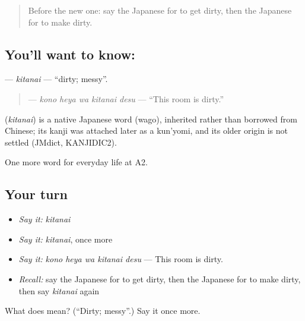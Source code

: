\label{lesson:JA-C160-kitanai}



\begin{quote}
Before the new one: say the Japanese for to get dirty, then the Japanese for to make dirty.
\end{quote}

\subsection*{You'll want to know: }
\textbf{} — \emph{kitanai} — \textquotedblleft{}dirty; messy\textquotedblright{}.

\begin{quote}
\textbf{  } — \emph{kono heya wa kitanai desu} — \textquotedblleft{}This room is dirty.\textquotedblright{}
\end{quote}

\begin{cousinweb}
\textbf{} (\emph{kitanai}) is a native Japanese word (wago), inherited rather than borrowed from Chinese; its kanji was attached later as a kun'yomi, and its older origin is not settled (JMdict, KANJIDIC2).
\end{cousinweb}

\begin{grammarlens}[title={What you've built}]
One more word for everyday life at A2.
\end{grammarlens}

\subsection*{Your turn}
\begin{itemize}
\raggedright
  \item \emph{Say it:} \emph{kitanai}
  \item \emph{Say it:} \emph{kitanai}, once more
  \item \emph{Say it:} \emph{kono heya wa kitanai desu} — This room is dirty.
  \item \emph{Recall:} say the Japanese for to get dirty, then the Japanese for to make dirty, then say \emph{kitanai} again
\end{itemize}

\begin{tcolorbox}[breakable,colback=teal!4,colframe=teal!35!black,title={Before you move on}]
What does  mean? (\textquotedblleft{}Dirty; messy\textquotedblright{}.) Say it once more.
\end{tcolorbox}
